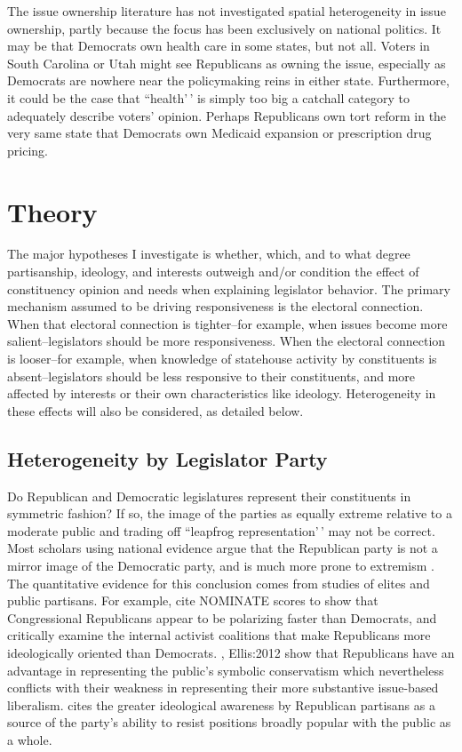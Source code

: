 \documentclass[
  oneside]{book}
\begin{document}
The issue ownership literature has not investigated spatial heterogeneity in issue ownership, partly because the focus has been exclusively on national politics. It may be that Democrats own health care in some states, but not all. Voters in South Carolina or Utah might see Republicans as owning the issue, especially as Democrats are nowhere near the policymaking reins in either state. Furthermore, it could be the case that ``health'\,' is simply too big a catchall category to adequately describe voters' opinion. Perhaps Republicans own tort reform in the very same state that Democrats own Medicaid expansion or prescription drug pricing.

\hypertarget{theory}{%
\chapter{Theory}\label{theory}}

The major hypotheses I investigate is whether, which, and to what degree partisanship, ideology, and interests outweigh and/or condition the effect of constituency opinion and needs when explaining legislator behavior. The primary mechanism assumed to be driving responsiveness is the electoral connection. When that electoral connection is tighter--for example, when issues become more salient--legislators should be more responsiveness. When the electoral connection is looser--for example, when knowledge of statehouse activity by constituents is absent--legislators should be less responsive to their constituents, and more affected by interests or their own characteristics like ideology. Heterogeneity in these effects will also be considered, as detailed below.

\hypertarget{heterogeneity-by-legislator-party}{%
\section{Heterogeneity by Legislator Party}\label{heterogeneity-by-legislator-party}}

Do Republican and Democratic legislatures represent their constituents in symmetric fashion? If so, the image of the parties as equally extreme relative to a moderate public and trading off ``leapfrog representation'\,' \citep{Herron:2010} may not be correct. Most scholars using national evidence argue that the Republican party is not a mirror image of the Democratic party, and is much more prone to extremism \citep[Mann:2016]{Hacker:2015}. The quantitative evidence for this conclusion comes from studies of elites and public partisans. For example, \citet{McCarty:2013} cite NOMINATE scores to show that Congressional Republicans appear to be polarizing faster than Democrats, and \citet{Grossmann:2016} critically examine the internal activist coalitions that make Republicans more ideologically oriented than Democrats. \citet{Ellis:2009}, Ellis:2012 show that Republicans have an advantage in representing the public's symbolic conservatism which nevertheless conflicts with their weakness in representing their more substantive issue-based liberalism. \citet{Lelkes:2016} cites the greater ideological awareness by Republican partisans as a source of the party's ability to resist positions broadly popular with the public as a whole.
\end{document}

